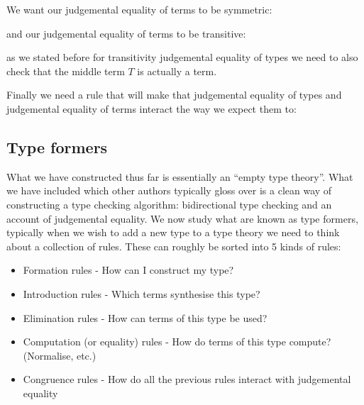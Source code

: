 \begin{defin}
    We want our judgemental equality of terms to be symmetric:
    \begin{prooftree}
    \end{prooftree}

    and our judgemental equality of terms to be transitive:
    \begin{prooftree}
    \end{prooftree}

    as we stated before for transitivity judgemental equality of types we need to also check that the middle term $T$ is actually a term.

    Finally we need a rule that will make  that judgemental equality of types and judgemental equality of terms interact the way we expect them to:
    \begin{prooftree}
    \end{prooftree}
\end{defin}

\subsection{Type formers}
What we have constructed thus far is essentially an ``empty type theory''. What we have included which other authors typically gloss over is a clean way of constructing a type checking algorithm: bidirectional type checking and an account of judgemental equality. We now study what are known as type formers, typically when we wish to add a new type to a type theory we need to think about a collection of rules. These can roughly be sorted into 5 kinds of rules:

\begin{itemize}
    \item Formation rules - How can I construct my type?
    \item Introduction rules - Which terms synthesise this type?
    \item Elimination rules - How can terms of this type be used?
    \item Computation (or equality) rules - How do terms of this type compute? (Normalise, etc.)
    \item Congruence rules - How do all the previous rules interact with judgemental equality
\end{itemize}

